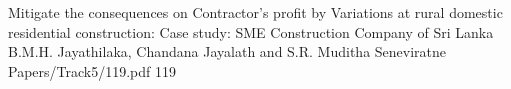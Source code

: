 
        \addpaper
    	{Mitigate the consequences on Contractor's profit by Variations at rural domestic residential construction: Case study: SME Construction Company of Sri Lanka}
   		 {B.M.H. Jayathilaka, Chandana Jayalath and S.R. Muditha Seneviratne} 
   		 {Papers/Track5/119.pdf}
        {119}








